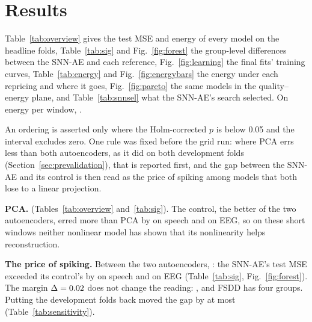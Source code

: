 \documentclass[conference]{IEEEtran}
\newif\ifplaceholder
\begin{document}
\begin{table}[!t]
\caption{Sensitivity to the development folds: SNN-AE minus ANN-AE, group level, without
(headline) and with them.}
\centering\footnotesize
\setlength{\tabcolsep}{3pt}

\label{tab:sensitivity}
\end{table}

\section{Results}
\label{sec:results}

\ifplaceholder
\par \fbox{\parbox{0.92\columnwidth}{\emph{Draft:} the tables of this section are placeholders
($-$) until the nested-LOSO grid has run; they are regenerated from the harness's outputs.}}
\fi

\par Table~\ref{tab:overview} gives the test MSE and energy of every model on the headline
folds, Table~\ref{tab:sig} and Fig.~\ref{fig:forest} the group-level differences between the
SNN-AE and each reference, Fig.~\ref{fig:learning} the final fits' training curves,
Table~\ref{tab:energy} and Fig.~\ref{fig:energybars} the energy under each repricing and where it
goes, Fig.~\ref{fig:pareto} the same models in the quality--energy plane, and
Table~\ref{tab:snnsel} what the SNN-AE's search selected. On energy per window, \energyVerdict.

\par An ordering is asserted only where the Holm-corrected $p$ is below 0.05 and the interval
excludes zero. One rule was fixed before the grid run: where PCA errs less than both
autoencoders, as it did on both development folds (Section~\ref{sec:prevalidation}), that is
reported first, and the gap between the SNN-AE and its control is then read as the price of
spiking among models that both lose to a linear projection.

\par \textbf{PCA.} \sigPcaVerdict{} (Tables~\ref{tab:overview} and~\ref{tab:sig}). The control,
the better of the two autoencoders, erred more than PCA by \sigAnnPcaSpeech{} on speech and
\sigAnnPcaEeg{} on EEG, so on these short windows neither nonlinear model has shown that its
nonlinearity helps reconstruction.

\par \textbf{The price of spiking.} Between the two autoencoders, \sigGapVerdict{}: the SNN-AE's
test MSE exceeded its control's by \sigGapSpeech{} on speech and \sigGapEeg{} on EEG
(Table~\ref{tab:sig}, Fig.~\ref{fig:forest}). The margin $\Delta=0.02$ does not change the
reading: \sigGapMargin, and FSDD has four groups. Putting the development folds back moved the gap
by at most \sigSensShift{} (Table~\ref{tab:sensitivity}).
\end{document}
